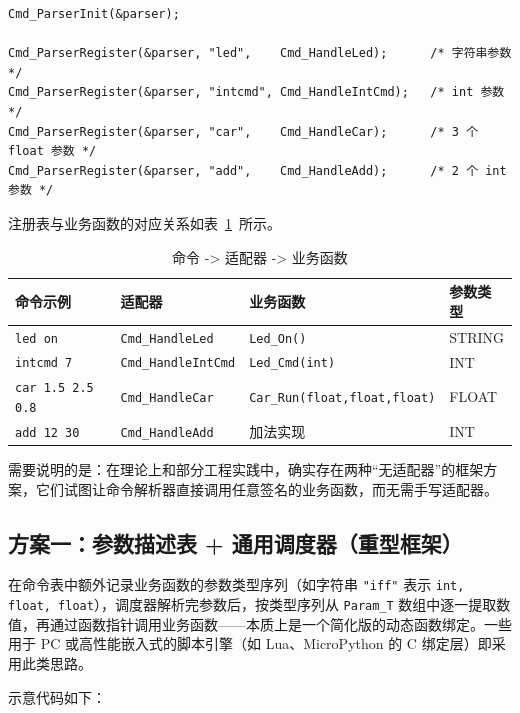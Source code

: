 \begin{lstlisting}[style=c]
Cmd_ParserInit(&parser);

Cmd_ParserRegister(&parser, "led",    Cmd_HandleLed);      /* 字符串参数 */
Cmd_ParserRegister(&parser, "intcmd", Cmd_HandleIntCmd);   /* int 参数 */
Cmd_ParserRegister(&parser, "car",    Cmd_HandleCar);      /* 3 个 float 参数 */
Cmd_ParserRegister(&parser, "add",    Cmd_HandleAdd);      /* 2 个 int 参数 */
\end{lstlisting}

注册表与业务函数的对应关系如表~\ref{tab:cmd-adapter}~所示。

\begin{table}[htbp]
\centering \caption{命令 -> 适配器 -> 业务函数} \label{tab:cmd-adapter}
    \begin{tabular}{llll}
        \toprule
        命令示例 & 适配器 & 业务函数 & 参数类型 \\
        \midrule
        \texttt{led on} & \texttt{Cmd\_HandleLed}   & \texttt{Led\_On()} & STRING \\
        \texttt{intcmd 7} & \texttt{Cmd\_HandleIntCmd} & \texttt{Led\_Cmd(int)} & INT \\
        \texttt{car 1.5 2.5 0.8} & \texttt{Cmd\_HandleCar} & \texttt{Car\_Run(float,float,float)} & FLOAT \\
        \texttt{add 12 30} & \texttt{Cmd\_HandleAdd} & 加法实现 & INT \\
        \bottomrule
    \end{tabular}
\end{table}

需要说明的是：在理论上和部分工程实践中，确实存在两种“无适配器”的框架方案，它们试图让命令解析器直接调用任意签名的业务函数，而无需手写适配器。

\subsection*{方案一：参数描述表 + 通用调度器（重型框架）}

在命令表中额外记录业务函数的参数类型序列（如字符串 \texttt{"iff"} 表示 \texttt{int, float, float}），调度器解析完参数后，按类型序列从 \texttt{Param\_T} 数组中逐一提取数值，再通过函数指针调用业务函数——本质上是一个简化版的动态函数绑定。一些用于 PC 或高性能嵌入式的脚本引擎（如 Lua、MicroPython 的 C 绑定层）即采用此类思路。

示意代码如下：

